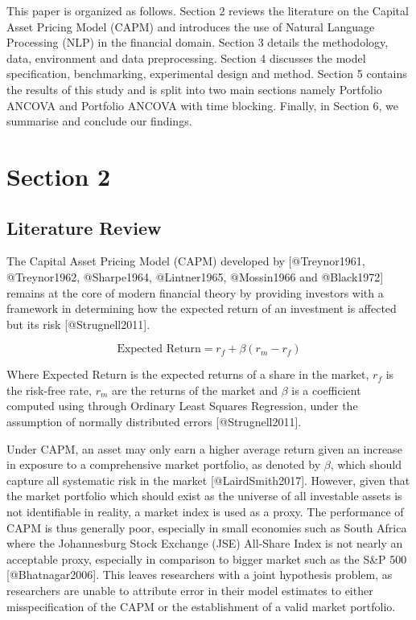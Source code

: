 \documentclass[11pt]{article}
\begin{document}
This paper is organized as follows. Section 2 reviews the literature on
the Capital Asset Pricing Model (CAPM) and introduces the use of Natural
Language Processing (NLP) in the financial domain. Section 3 details the
methodology, data, environment and data preprocessing. Section 4
discusses the model specification, benchmarking, experimental design and
method. Section 5 contains the results of this study and is split into
two main sections namely Portfolio ANCOVA and Portfolio ANCOVA with time
blocking. Finally, in Section 6, we summarise and conclude our findings.

\hypertarget{section-2}{%
\section{Section 2}\label{section-2}}

\hypertarget{literature-review}{%
\subsection{Literature Review}\label{literature-review}}

The Capital Asset Pricing Model (CAPM) developed by {[}@Treynor1961,
@Treynor1962, @Sharpe1964, @Lintner1965, @Mossin1966 and @Black1972{]}
remains at the core of modern financial theory by providing investors
with a framework in determining how the expected return of an investment
is affected but its risk {[}@Strugnell2011{]}.

\[ \text{Expected Return} = r_{f} + \beta(r_{m} - r_{f})\]

Where Expected Return is the expected returns of a share in the market,
\(r_{f}\) is the risk-free rate, \(r_{m}\) are the returns of the market
and \(\beta\) is a coefficient computed using through Ordinary Least
Squares Regression, under the assumption of normally distributed errors
{[}@Strugnell2011{]}.

Under CAPM, an asset may only earn a higher average return given an
increase in exposure to a comprehensive market portfolio, as denoted by
\(\beta\), which should capture all systematic risk in the market
{[}@LairdSmith2017{]}. However, given that the market portfolio which
should exist as the universe of all investable assets is not
identifiable in reality, a market index is used as a proxy. The
performance of CAPM is thus generally poor, especially in small
economies such as South Africa where the Johannesburg Stock Exchange
(JSE) All-Share Index is not nearly an acceptable proxy, especially in
comparison to bigger market such as the S\&P 500 {[}@Bhatnagar2006{]}.
This leaves researchers with a joint hypothesis problem, as researchers
are unable to attribute error in their model estimates to either
misspecification of the CAPM or the establishment of a valid market
portfolio.
\end{document}

